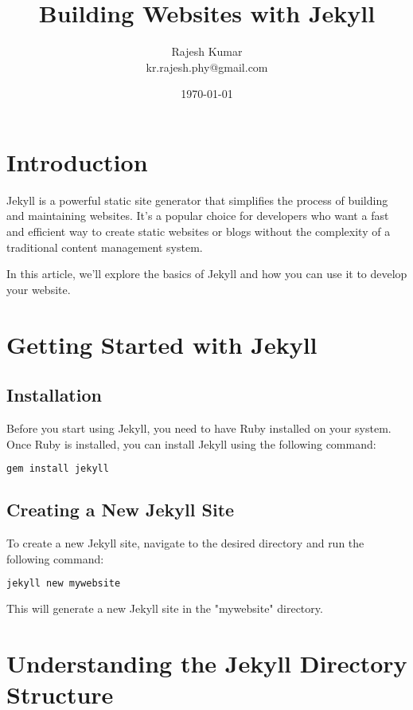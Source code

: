 \documentclass{book}
\title{Building Websites with Jekyll}
\author{Rajesh Kumar\\kr.rajesh.phy@gmail.com}
\date{\today}
\begin{document}
\maketitle

\section*{Introduction}

Jekyll is a powerful static site generator that simplifies the process of building and maintaining websites. It's a popular choice for developers who want a fast and efficient way to create static websites or blogs without the complexity of a traditional content management system.

In this article, we'll explore the basics of Jekyll and how you can use it to develop your website.

\section*{Getting Started with Jekyll}

\subsection*{Installation}

Before you start using Jekyll, you need to have Ruby installed on your system. Once Ruby is installed, you can install Jekyll using the following command:

\begin{lstlisting}[language=bash]
gem install jekyll
\end{lstlisting}

\subsection*{Creating a New Jekyll Site}

To create a new Jekyll site, navigate to the desired directory and run the following command:

\begin{lstlisting}[language=bash]
jekyll new mywebsite
\end{lstlisting}

This will generate a new Jekyll site in the "mywebsite" directory.

\section*{Understanding the Jekyll Directory Structure}
\end{document}
